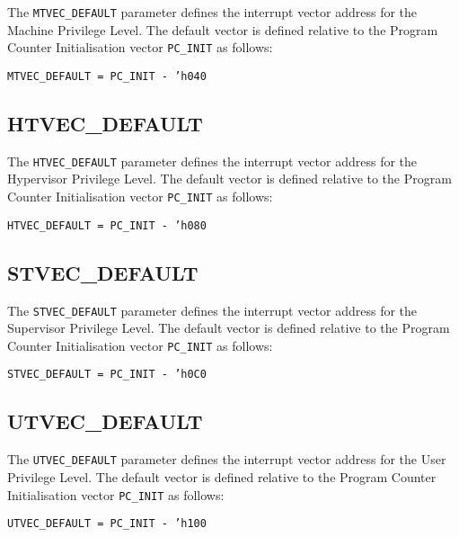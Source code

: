 The \texttt{MTVEC\_DEFAULT} parameter defines the interrupt vector address for
the Machine Privilege Level. The default vector is defined relative to
the Program Counter Initialisation vector \texttt{PC\_INIT} as follows:

\texttt{MTVEC\_DEFAULT = PC\_INIT - 'h040}

\subsection{HTVEC\_DEFAULT}\label{htvec_default}

The \texttt{HTVEC\_DEFAULT} parameter defines the interrupt vector address for
the Hypervisor Privilege Level. The default vector is defined relative
to the Program Counter Initialisation vector \texttt{PC\_INIT} as follows:

\texttt{HTVEC\_DEFAULT = PC\_INIT - 'h080}

\subsection{STVEC\_DEFAULT}\label{stvec_default}

The \texttt{STVEC\_DEFAULT} parameter defines the interrupt vector address for
the Supervisor Privilege Level. The default vector is defined relative
to the Program Counter Initialisation vector \texttt{PC\_INIT} as follows:

\texttt{STVEC\_DEFAULT = PC\_INIT - 'h0C0}

\subsection{UTVEC\_DEFAULT}\label{utvec_default}

The \texttt{UTVEC\_DEFAULT} parameter defines the interrupt vector address for
the User Privilege Level. The default vector is defined relative to the
Program Counter Initialisation vector \texttt{PC\_INIT} as follows:

\texttt{UTVEC\_DEFAULT = PC\_INIT - 'h100}



